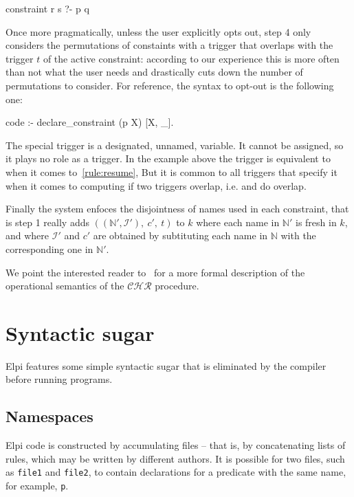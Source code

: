 \documentclass[a4paper, 11pt]{book}
\begin{document}
\begin{elpicode}
constraint r s ?- p q {
}
\end{elpicode}
Once more pragmatically, unless
the user explicitly opts out, step 4 only considers the permutations of
constaints with a trigger that overlaps with the trigger $t$ of the active
constraint: according to our experience this is more often than not what
the user needs and drastically cuts down the number of permutations to consider.
For reference, the syntax to opt-out is the following one:
\begin{elpicode}
code :- declare_constraint (p X) [X, _].
\end{elpicode}
The special trigger \elpi{_} is a designated, unnamed, variable.
It cannot be assigned, so it plays no role as a trigger. In
the example above the trigger \elpi{[X, _]} is equivalent to
\elpi{[X]} when it comes to~\ref{rule:resume},
But it is common to all triggers that specify it when it comes
to computing if two triggers overlap, i.e. \elpi{[X, _]}
and \elpi{[Y, _]} do overlap.

Finally the system enfoces the disjointness of names used in each constraint, that
is step 1 really adds $((\mathbb{N'},\mathcal{I'}),\ c',\ t)$ to $k$
where each name in $\mathbb{N'}$ is fresh in $k$, and where
$\mathcal{I'}$ and $c'$ are obtained by subtituting each name in
$\mathbb{N}$ with the corresponding one in $\mathbb{N}'$.

We point the interested
reader to~\cite{TASSI_2019} for a more formal description of the
operational semantics of the $\mathcal{CHR}$ procedure.


\section{Syntactic sugar}


Elpi features some simple syntactic sugar that is eliminated by the compiler
before running programs.

\subsection{Namespaces}

Elpi code is constructed by accumulating files -- that is, by concatenating lists
of rules, which may be written by different authors. It is possible for two
files, such as \texttt{file1} and \texttt{file2}, to contain declarations for a
predicate with the same name, for example, \texttt{p}.
\end{document}
